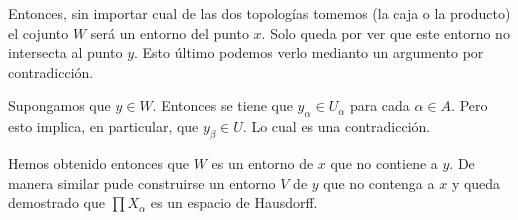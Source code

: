 \documentclass[fleqn,leqno,letterpaper,10pt,final]{article}
\begin{document}
Entonces, sin importar cual de las dos topologías tomemos (la caja o la producto)
el cojunto $W$ será un entorno del punto $x$. Solo queda por ver que este entorno
no intersecta al punto $y$. Esto último podemos verlo medianto un argumento por
contradicción.

Supongamos que $y\in W$. Entonces se tiene que $y_\alpha\in U_\alpha$ para cada $\alpha\in A$.
Pero esto implica, en particular, que $y_{\beta}\in U$.
Lo cual es una contradicción.

Hemos obtenido entonces que $W$ es un entorno de $x$ que no contiene a $y$.
De manera similar pude construirse un entorno $V$ de $y$ que no contenga a $x$
y queda demostrado que $\prod X_\alpha$ es un espacio de Hausdorff.
\printbibliography[
heading=bibintoc,
title={Referencias}
]
\end{document}
